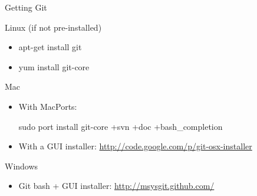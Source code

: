 \documentclass[xcolor=dvipsnames]{beamer}
\begin{document}
\begin{frame}{Getting Git}

{\LARGE Linux} (if not pre-installed)
\begin{itemize}
\item \begin{semiverbatim} apt-get install git \end{semiverbatim}
\item \begin{semiverbatim} yum install git-core \end{semiverbatim}
\end{itemize}

\vspace{2mm}
{\LARGE Mac}
\begin{itemize}
\item With MacPorts: \begin{semiverbatim} sudo port install git-core +svn +doc +bash{\_}completion \end{semiverbatim}
\item With a GUI installer: \url{http://code.google.com/p/git-osx-installer}
\end{itemize}

\vspace{2mm}
{\LARGE Windows}
\begin{itemize}
\item Git bash + GUI installer: \url{http://msysgit.github.com/}
\end{itemize}


\end{frame}
\end{document}
